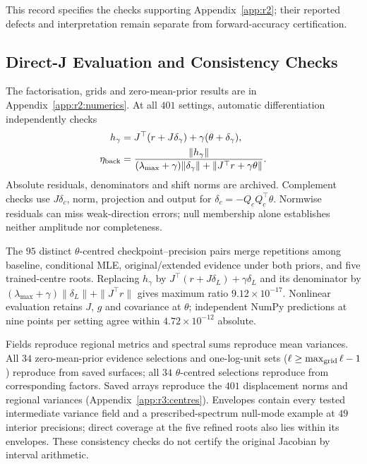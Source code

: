 This record specifies the checks supporting Appendix~\ref{app:r2}; their
reported defects and interpretation remain separate from forward-accuracy certification.

\subsection{Direct-J Evaluation and Consistency Checks}
The factorisation, grids and zero-mean-prior results are in
Appendix~\ref{app:r2:numerics}. At all $401$ settings, automatic differentiation
independently checks
\begin{align*}
 h_\gamma&=J^\top(r+J\delta_\gamma)+\gamma(\theta+\delta_\gamma),\\
 \eta_{\rm back}&=\frac{\|h_\gamma\|}
 { (\lambda_{\max}+\gamma)\|\delta_\gamma\|
       +\|J^\top r+\gamma\theta\|}.
\end{align*}
Absolute residuals, denominators and shift norms are archived. Complement checks
use $J\delta_c$, norm, projection and output for
$\delta_c=-Q_cQ_c^\top\theta$. Normwise residuals can miss weak-direction errors;
null membership alone establishes neither amplitude nor completeness.

The $95$ distinct $\theta$-centred checkpoint--precision pairs merge repetitions
among baseline, conditional MLE, original/extended evidence under both priors,
and five trained-centre roots. Replacing $h_\gamma$ by
$J^\top(r+J\delta_L)+\gamma\delta_L$ and its denominator by
$(\lambda_{\max}+\gamma)\|\delta_L\|+\|J^\top r\|$ gives maximum ratio
$9.12\times10^{-17}$. Nonlinear evaluation retains $J$, $g$ and covariance at
$\theta$; independent NumPy predictions at nine points per setting agree within
$4.72\times10^{-12}$ absolute.

Fields reproduce regional metrics and spectral sums reproduce mean variances.
All $34$ zero-mean-prior evidence selections and one-log-unit sets
($\ell\ge\max_{\rm grid}\ell-1$) reproduce from
saved surfaces; all $34$ $\theta$-centred selections reproduce from corresponding factors.
Saved arrays reproduce the $401$ displacement norms and regional variances
(Appendix~\ref{app:r3:centres}). Envelopes contain every tested intermediate
variance field and a prescribed-spectrum null-mode example at $49$ interior
precisions; direct coverage at the five refined roots also lies within its
envelopes. These consistency
checks do not certify the original Jacobian by interval arithmetic.

